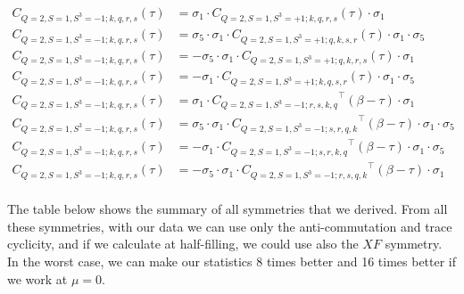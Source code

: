 \begin{equation*}
  \begin{aligned}
    C_{Q=2,S=1,S^3=-1;k,q,r,s} (\tau) &= \sigma_1\cdot{C_{Q=2,S=1,S^3=+1;k,q,r,s}} (\tau) \cdot\sigma_1
    \\
    C_{Q=2,S=1,S^3=-1;k,q,r,s} (\tau) &= \sigma_5\cdot \sigma_1\cdot{C_{Q=2,S=1,S^3=+1;q,k,s,r}} (\tau) \cdot\sigma_1\cdot\sigma_5
    \\
    C_{Q=2,S=1,S^3=-1;k,q,r,s} (\tau) &= - \sigma_5\cdot \sigma_1\cdot{C_{Q=2,S=1,S^3=+1;q,k,r,s}} (\tau) \cdot\sigma_1
    \\
    C_{Q=2,S=1,S^3=-1;k,q,r,s} (\tau) &= - \sigma_1\cdot{C_{Q=2,S=1,S^3=+1;k,q,s,r}} (\tau) \cdot\sigma_1\cdot\sigma_5
    \\
    C_{Q=2,S=1,S^3=-1;k,q,r,s} (\tau) &= \sigma_1\cdot{C_{Q=2,S=1,S^3=-1;r,s,k,q}}^\top (\beta-\tau) \cdot\sigma_1 
    \\
    C_{Q=2,S=1,S^3=-1;k,q,r,s} (\tau) &= \sigma_5\cdot \sigma_1\cdot{C_{Q=2,S=1,S^3=-1;s,r,q,k}}^\top (\beta-\tau) \cdot\sigma_1\cdot\sigma_5
    \\
    C_{Q=2,S=1,S^3=-1;k,q,r,s} (\tau) &= - \sigma_1\cdot{C_{Q=2,S=1,S^3=-1;s,r,k,q}}^\top (\beta-\tau) \cdot\sigma_1\cdot\sigma_5 
    \\
    C_{Q=2,S=1,S^3=-1;k,q,r,s} (\tau) &= - \sigma_5\cdot \sigma_1\cdot{C_{Q=2,S=1,S^3=-1;r,s,q,k}}^\top (\beta-\tau) \cdot\sigma_1
    \\
  \end{aligned}
\end{equation*}

The table below shows the summary of all symmetries that we derived. From all these symmetries, with our data we can use only the anti-commutation and trace cyclicity, and if we calculate at half-filling, we could use also the $XF$ symmetry. In the worst case, we can make our statistics 8 times better and 16 times better if we work at $\mu = 0$.

